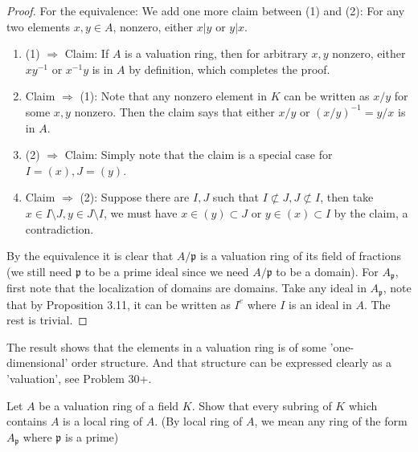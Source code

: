 \documentclass{solution}
\begin{document}
\begin{proof}
    For the equivalence: We add one more claim between (1) and (2): For any two elements $x, y \in A$, nonzero, either $x | y$ or $y | x$.
    \begin{enumerate}
        \item (1) $\Rightarrow$ Claim: If $A$ is a valuation ring, then for arbitrary $x, y$ nonzero, either $xy ^{-1}$ or $x ^{-1} y$ is in $A$ by definition, which completes the proof.
        \item Claim $\Rightarrow$ (1): Note that any nonzero element in $K$ can be written as $x / y$ for some $x, y$ nonzero. Then the claim says that either $x / y$ or $(x / y) ^{-1} = y / x$ is in $A$.
        \item (2) $\Rightarrow$ Claim: Simply note that the claim is a special case for $I = (x), J = (y)$.
        \item Claim $\Rightarrow$ (2): Suppose there are $I, J$ such that $I \not\subset J, J \not\subset I$, then take $x \in I \setminus J, y \in J \setminus I$, we must have $x \in (y) \subset J$ or $y \in (x) \subset I$ by the claim, a contradiction.
    \end{enumerate}

    By the equivalence it is clear that $A / \mathfrak{p}$ is a valuation ring of its field of fractions (we still need $\mathfrak{p}$ to be a prime ideal since we need $A / \mathfrak{p}$ to be a domain). For $A_{\mathfrak{p}}$, first note that the localization of domains are domains. Take any ideal in $A_{\mathfrak{p}}$, note that by Proposition 3.11, it can be written as $I^e$ where $I$ is an ideal in $A$. The rest is trivial. 
\end{proof}

{\color{red} The result shows that the elements in a valuation ring is of some 'one-dimensional' order structure. And that structure can be expressed clearly as a 'valuation', see Problem 30+.}

\begin{problem}
    Let $A$ be a valuation ring of a field $K$. Show that every subring of $K$ which contains $A$ is a local ring of $A$. (By local ring of $A$, we mean any ring of the form $A_{\mathfrak{p}}$ where $\mathfrak{p}$ is a prime)
\end{problem}
\end{document}
